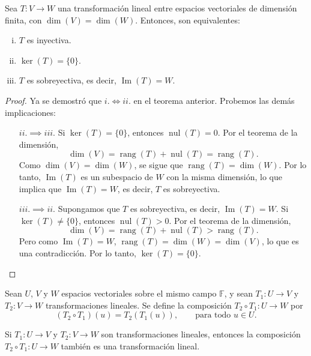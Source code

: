 \begin{theorem}
Sea $T: V \to W$ una transformación lineal entre espacios vectoriales de dimensión finita, con $\dim(V) = \dim(W)$. Entonces, son equivalentes:
\begin{enumerate}[i.]
    \item $T$ es inyectiva.
    \item $\ker(T) = \{0\}$.
    \item $T$ es sobreyectiva, es decir, $\operatorname{Im}(T) = W$.
\end{enumerate}
\begin{proof}
Ya se demostró que $i. \iff ii.$ en el teorema anterior. Probemos las demás implicaciones:

\begin{itemize}
    \item[$ii. \implies iii.$] Si $\ker(T) = \{0\}$, entonces $\operatorname{nul}(T) = 0$. Por el teorema de la dimensión,
    \[
    \dim(V) = \operatorname{rang}(T) + \operatorname{nul}(T) = \operatorname{rang}(T).
    \]
    Como $\dim(V) = \dim(W)$, se sigue que $\operatorname{rang}(T) = \dim(W)$. Por lo tanto, $\operatorname{Im}(T)$ es un subespacio de $W$ con la misma dimensión, lo que implica que $\operatorname{Im}(T) = W$, es decir, $T$ es sobreyectiva.

    \item[$iii. \implies ii.$] Supongamos que $T$ es sobreyectiva, es decir, $\operatorname{Im}(T) = W$. Si $\ker(T) \neq \{0\}$, entonces $\operatorname{nul}(T) > 0$. Por el teorema de la dimensión,
    \[
    \dim(V) = \operatorname{rang}(T) + \operatorname{nul}(T) > \operatorname{rang}(T).
    \]
    Pero como $\operatorname{Im}(T) = W$, $\operatorname{rang}(T) = \dim(W) = \dim(V)$, lo que es una contradicción. Por lo tanto, $\ker(T) = \{0\}$.
\end{itemize}
\end{proof}
\end{theorem}


\begin{definition}
Sean $U$, $V$ y $W$ espacios vectoriales sobre el mismo campo $\mathbb{F}$, y sean $T_1: U \to V$ y $T_2: V \to W$ transformaciones lineales. Se define la composición $T_2 \circ T_1: U \to W$ por
\[
(T_2 \circ T_1)(u) = T_2(T_1(u)), \qquad \text{para todo } u \in U.
\]
\end{definition}

\begin{theorem}
Si $T_1: U \to V$ y $T_2: V \to W$ son transformaciones lineales, entonces la composición $T_2 \circ T_1: U \to W$ también es una transformación lineal.
\end{theorem}

